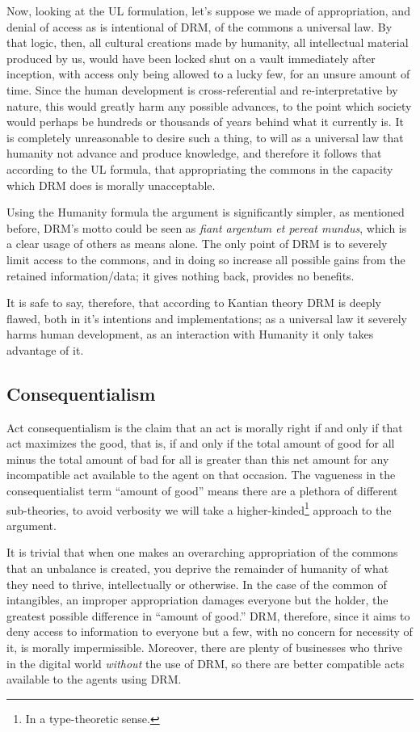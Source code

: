 \documentclass[12pt,letterpaper]{article}
\begin{document}
Now, looking at the UL formulation, let's suppose we made of appropriation, and denial of access as is intentional of DRM, of the commons a universal law. By that logic, then, all cultural creations made by humanity, all intellectual material produced by us, would have been locked shut on a vault immediately after inception, with access only being allowed to a lucky few, for an unsure amount of time.
Since the human development is cross-referential and re-interpretative by nature, this would greatly harm any possible advances, to the point which society would perhaps be hundreds or thousands of years behind what it currently is.
It is completely unreasonable to desire such a thing, to will as a universal law that humanity not advance and produce knowledge, and therefore it follows that according to the UL formula, that appropriating the commons in the capacity which DRM does is morally unacceptable.

Using the Humanity formula the argument is significantly simpler, as mentioned before, DRM's motto could be seen as \emph{fiant argentum et pereat mundus}, which is a clear usage of others as means alone. The only point of DRM is to severely limit access to the commons, and in doing so increase all possible gains from the retained information/data; it gives nothing back, provides no benefits.

It is safe to say, therefore, that according to Kantian theory DRM is deeply flawed, both in it's intentions and implementations; as a universal law it severely harms human development, as an interaction with Humanity it only takes advantage of it.

\subsection{Consequentialism}
Act consequentialism is the claim that an act is morally right if and only if that act maximizes the good, that is, if and only if the total amount of good for all minus the total amount of bad for all is greater than this net amount for any incompatible act available to the agent on that occasion.\autocite{sep-consequentialism}
The vagueness in the consequentialist term ``amount of good'' means there are a plethora of different sub-theories, to avoid verbosity we will take a higher-kinded\footnote{In a type-theoretic sense.} approach to the argument.

It is trivial that when one makes an overarching appropriation of the commons that an unbalance is created, you deprive the remainder of humanity of what they need to thrive, intellectually or otherwise. In the case of the common of intangibles, an improper appropriation damages everyone but the holder, the greatest possible difference in ``amount of good.''
DRM, therefore, since it aims to deny access to information to everyone but a few, with no concern for necessity of it, is morally impermissible. Moreover, there are plenty of businesses who thrive in the digital world \emph{without} the use of DRM, so there are better compatible acts available to the agents using DRM.\@
\end{document}
